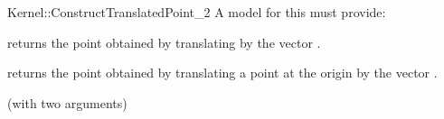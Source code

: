 \begin{ccRefFunctionObjectConcept}{Kernel::ConstructTranslatedPoint_2}
A model for this must provide:


       {returns the point obtained by translating  by the vector 
        .}

       {returns the point obtained by translating a point at the origin by the vector 
        .}

\ccRefines
{} (with two arguments)

\ccSeeAlso
{}\\

\end{ccRefFunctionObjectConcept}
